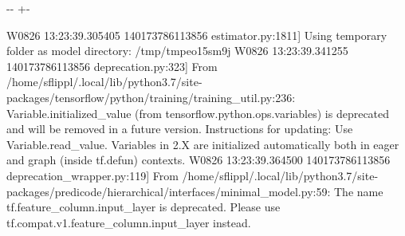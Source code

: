 \documentclass[letterpaper,10pt,english]{sphinxmanual}
\newlength\nbsphinxcodecellspacing
\begin{document}
%
{
\kern-\sphinxverbatimsmallskipamount\kern-\baselineskip
\kern+\FrameHeightAdjust\kern-\fboxrule
\vspace{\nbsphinxcodecellspacing}
%
\begin{sphinxVerbatim}[commandchars=\\\{\}]
W0826 13:23:39.305405 140173786113856 estimator.py:1811] Using temporary folder as model directory: /tmp/tmpeo15sm9j
W0826 13:23:39.341255 140173786113856 deprecation.py:323] From /home/sflippl/.local/lib/python3.7/site-packages/tensorflow/python/training/training\_util.py:236: Variable.initialized\_value (from tensorflow.python.ops.variables) is deprecated and will be removed in a future version.
Instructions for updating:
Use Variable.read\_value. Variables in 2.X are initialized automatically both in eager and graph (inside tf.defun) contexts.
W0826 13:23:39.364500 140173786113856 deprecation\_wrapper.py:119] From /home/sflippl/.local/lib/python3.7/site-packages/predicode/hierarchical/interfaces/minimal\_model.py:59: The name tf.feature\_column.input\_layer is deprecated. Please use tf.compat.v1.feature\_column.input\_layer instead.


\end{sphinxVerbatim}}
\end{document}
